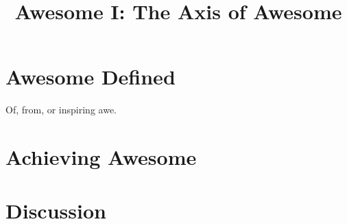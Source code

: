\documentclass{article}
\begin{document}
\title{Awesome I: The Axis of Awesome}

\section{Awesome Defined}

Of, from, or inspiring awe.

\section{Achieving Awesome}


\section{Discussion}
\end{document}

